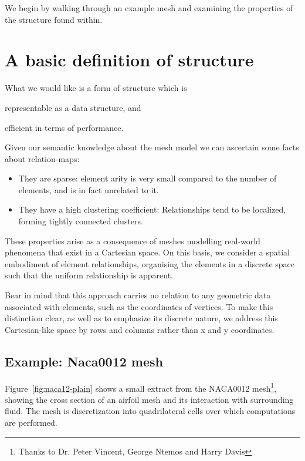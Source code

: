 \label{chap:diving-into-problem}
We begin by walking through an example mesh and examining the properties of the structure found within.

\section{A basic definition of structure}
What we would like is a form of structure which is
\begin{enumerate*}[label=\alph*)]
\item representable as a data structure, and \item efficient in terms of performance.
\end{enumerate*}

Given our semantic knowledge about the mesh model we can ascertain some facts about relation-maps:
\begin{itemize}
\item They are sparse: element arity is very small compared to the number of elements, and is in fact unrelated to it.
\item They have a high clustering coefficient: Relationships tend to be localized, forming tightly connected clusters.
\end{itemize}

These properties arise as a consequence of meshes modelling real-world phenomena that exist in a Cartesian space.
On this basis, we consider a spatial embodiment of element relationships, organising the elements in a discrete space such that the uniform relationship is apparent.

Bear in mind that this approach carries no relation to any geometric data associated with elements, such as the coordinates of vertices. To make this distinction clear, as well as to emphasize its discrete nature, we address this Cartesian-like space by rows and columns rather than x and y coordinates.

\subsection{Example: Naca0012 mesh}
Figure~\ref{fig:naca12-plain} shows a small extract from the NACA0012 mesh\footnote{Thanks to Dr. Peter Vincent, George Ntemos and Harry Davis}, showing the cross section of an airfoil mesh and its interaction with surrounding fluid. The mesh is discretization into quadrilateral cells over which computations are performed.

